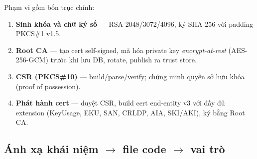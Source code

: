\documentclass[12pt,a4paper]{article}
\begin{document}
Phạm vi gồm bốn trục chính:
\begin{enumerate}
  \item \textbf{Sinh khóa và chữ ký số} — RSA 2048/3072/4096, ký SHA-256 với
        padding PKCS\#1 v1.5.
  \item \textbf{Root CA} — tạo cert self-signed, mã hóa private key
        \emph{encrypt-at-rest} (AES-256-GCM) trước khi lưu DB, rotate, publish
        ra trust store.
  \item \textbf{CSR (PKCS\#10)} — build/parse/verify; chứng minh quyền sở hữu
        khóa (proof of possession).
  \item \textbf{Phát hành cert} — duyệt CSR, build cert end-entity v3 với đầy đủ
        extension (KeyUsage, EKU, SAN, CRLDP, AIA, SKI/AKI), ký bằng Root CA.
\end{enumerate}

\subsection{Ánh xạ khái niệm $\to$ file code $\to$ vai trò}
\end{document}
